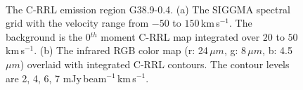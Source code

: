 \documentclass[manuscript]{aastex61}
\newcommand{\kms}{\,km\,s$^{-1}$}
\newcommand{\um}{\mu m}
\begin{document}
\begin{figure}[H]
	\centering
	\\
	\caption{The C-RRL emission region G38.9-0.4.
	(a) The SIGGMA spectral grid with the velocity range from $-50$ to $150$\kms.
	The background is the 0$^{th}$ moment C-RRL map integrated over $20$ to $50$\kms.
	(b) The infrared RGB color map (r: 24\,$\um$, g: 8\,$\um$, b: 4.5\,$\um$) overlaid with integrated C-RRL contours.
	The contour levels are 2, 4, 6, 7 mJy\,beam$^{-1}$\kms.}
	\label{fig_crrl-g389}
\end{figure}
\end{document}
